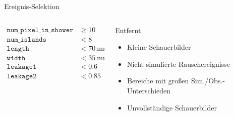 \documentclass[aspectratio=1610, 9pt]{beamer}
\begin{document}
\begin{frame}[c]{Ereignis-Selektion}
  \begin{columns}[onlytextwidth, c]
    \begin{column}{0.475\textwidth}%
      \begin{align*}
        \mathtt{num\_pixel\_in\_shower} &\geq 10 \\
        \mathtt{num\_islands} &< 8 \\
        \mathtt{length} &< \SI{70}{\milli\meter} \\
        \mathtt{width} &< \SI{35}{\milli\meter} \\
        \mathtt{leakage1} &< 0.6  \\
        \mathtt{leakage2} &< 0.85
      \end{align*}
    \end{column}%
    \begin{column}{0.475\textwidth}
      Entfernt
      \begin{itemize}
        \item Kleine Schauerbilder
        \item Nicht simulierte Rauschereignisse
        \item Bereiche mit großen Sim./Obs.-Unterschieden
        \item Unvollständige Schauerbilder
      \end{itemize}
    \end{column}
  \end{columns}
\end{frame}
\end{document}

